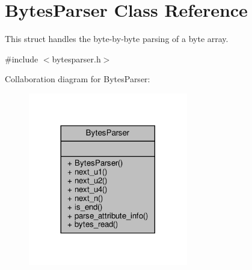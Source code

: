 \hypertarget{classBytesParser}{}\section{Bytes\+Parser Class Reference}
\label{classBytesParser}


This struct handles the byte-\/by-\/byte parsing of a byte array.  




{\ttfamily \#include $<$bytesparser.\+h$>$}



Collaboration diagram for Bytes\+Parser\+:\nopagebreak
\begin{figure}[H]
\begin{center}
\leavevmode
\includegraphics[width=197pt]{classBytesParser__coll__graph}
\end{center}
\end{figure}
